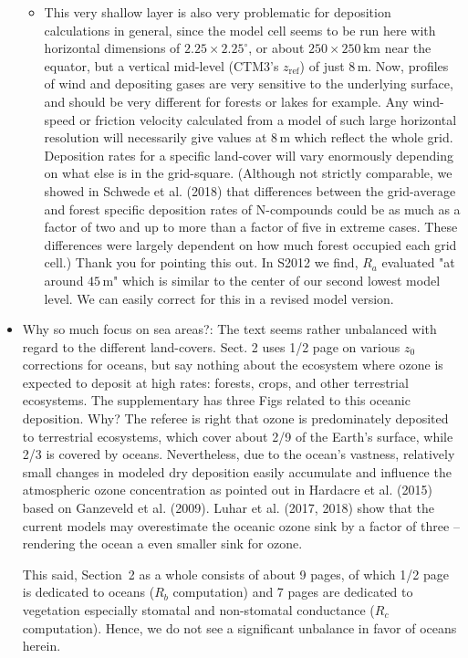 \begin{itemize}
\begin{itemize}
\item {\color{blue} This very shallow layer is also very problematic for deposition calculations in general,
since the model cell seems to be run here with horizontal dimensions of $2.25 \times 2.25^\circ$,
or about $250 \times 250\,\mathrm{km}$ near the equator, but a vertical mid-level (CTM3’s $z_\mathrm{ref}$) of
just 8\,m. Now, profiles of wind and depositing gases are very sensitive to the underlying
surface, and should be very different for forests or lakes for example. Any wind-speed
or friction velocity calculated from a model of such large horizontal resolution will necessarily give values
at 8\,m which reflect the whole grid. Deposition rates for a specific
land-cover will vary enormously depending on what else is in the grid-square. (Although not strictly comparable,
we showed in Schwede et al. (2018) that differences
between the grid-average and forest specific deposition rates of N-compounds could be
as much as a factor of two and up to more than a factor of five in extreme cases. These
differences were largely dependent on how much forest occupied each grid cell.)}
  Thank you for pointing this out. In S2012 we find, $R_a$ evaluated "at around $45\,\mathrm{m}$" which is similar to the center of our second lowest model level. We can easily correct for this in a revised model version. 
  \end{itemize}
  
\item {\color{blue} Why so much focus on sea areas?: The text seems rather unbalanced with regard to the different land-covers. Sect. 2 uses 1/2 page on various $z_0$ corrections for oceans, but say nothing about the ecosystem
where ozone is expected to deposit at high rates: forests, crops, and other terrestrial
ecosystems. The supplementary has three Figs related to this oceanic deposition. Why?}
  The referee is right that ozone is predominately deposited to terrestrial ecosystems, which cover about 2/9 of the Earth's surface, while 2/3 is covered by oceans. Nevertheless, due to the ocean's vastness, relatively small changes in modeled dry deposition easily accumulate and influence the atmospheric ozone concentration as pointed out in Hardacre et al. (2015) based on Ganzeveld et al. (2009). Luhar et al. (2017, 2018) show that the current models may overestimate the oceanic ozone sink by a factor of three -- rendering the ocean a even smaller sink for ozone.
  
  This said, Section~2 as a whole consists of about 9 pages, of which 1/2 page is dedicated to oceans ($R_b$ computation) and 7 pages are dedicated to vegetation especially stomatal and non-stomatal conductance ($R_c$ computation). Hence, we do not see a significant unbalance in favor of oceans herein.


\end{itemize}
